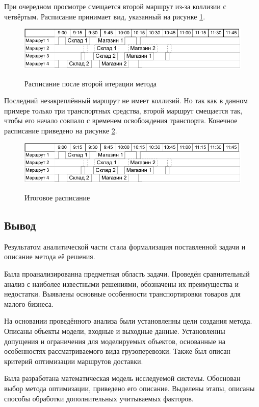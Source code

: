 	При очередном просмотре смещается второй маршрут из-за коллизии с четвёртым. Расписание принимает вид, указанный на рисунке \ref{pic:sch_3}.
	
	\begin{figure}[h]
		\begin{center}
			{\includegraphics[scale=1.0, angle=0]{img/schedule/3.pdf}}
			\caption{Расписание после второй итерации метода}
			\label{pic:sch_3}
		\end{center}
	\end{figure}

	Последний незакреплённый маршрут не имеет коллизий. Но так как в данном примере только три транспортных средства, второй маршрут смещается так, чтобы его начало совпало с временем освобождения транспорта. Конечное расписание приведено на рисунке \ref{pic:sch_4}.
	
	\begin{figure}[h]
		\begin{center}
			{\includegraphics[scale=1.0, angle=0]{img/schedule/3.pdf}}
			\caption{Итоговое расписание}
			\label{pic:sch_4}
		\end{center}
	\end{figure}

\subsection*{Вывод}
Результатом аналитической части стала формализация поставленной задачи и описание метода её решения.

Была проанализированна предметная область задачи. Проведён сравнительный анализ с наиболее известными решениями, обозначены их преимущества и недостатки. Выявлены основные особенности транспортировки товаров для малого бизнеса.

На основании проведённого анализа были установленны цели создания метода. Описаны объекты модели, входные и выходные данные. Установленны допущения и ограничения для моделируемых объектов, основанные на особенностях рассматриваемого вида грузоперевозки. Также был описан критерий оптимизации маршрутов доставки.

Была разработана математическая модель исследуемой системы. Обоснован выбор метода оптимизации, приведено его описание. Выделены этапы, описаны способы обработки дополнительных учитываемых факторов.

\pagebreak